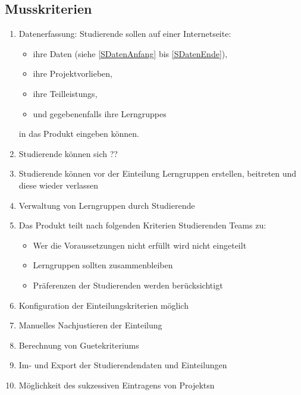 \documentclass[parskip=full]{scrartcl}
\newcommand{\swtLabel}[1]{\textbf{/#1\arabic*0/}}
\begin{document}
\subsection{Musskriterien}
 \begin{enumerate}[label=\swtLabel{M}]
   \item Datenerfassung: Studierende sollen auf einer Internetseite:   
   \begin{itemize}
     \item ihre Daten (siehe \ref{SDatenAnfang} bis \ref{SDatenEnde}),     
     \item ihre Projektvorlieben, 
     \item ihre \glspl{Teilleistung},
     \item und gegebenenfalls ihre \glspl{Lerngruppe}
   \end{itemize}
   in das Produkt eingeben können.
   \item Studierende können sich ?? %
   \item Studierende können vor der Einteilung Lerngruppen erstellen, beitreten
    und diese wieder verlassen
    \item Verwaltung von Lerngruppen durch Studierende %
   \item Das Produkt teilt nach folgenden Kriterien Studierenden Teams zu:
   \label{Mzuteilung}
   \begin{itemize}
     \item Wer die Voraussetzungen nicht erfüllt wird nicht eingeteilt
     \item Lerngruppen sollten zusammenbleiben
     \item Präferenzen der Studierenden werden berücksichtigt
   \end{itemize}
     \item Konfiguration der Einteilungskriterien möglich
   \item Manuelles Nachjustieren der Einteilung
   \item Berechnung von \glspl{Guetekriterium}
   \item Im- und Export der Studierendendaten und
   Einteilungen %
   \item Möglichkeit des sukzessiven Eintragens von \glspl{Projekt}n
  
 \end{enumerate}
\end{document}
